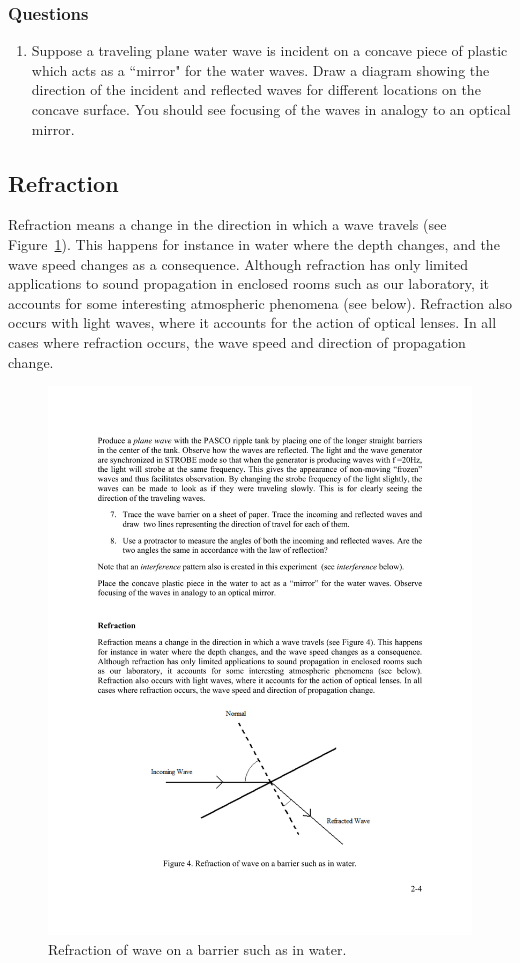 \documentclass[11pt]{NSF}
\def\ben{\begin{enumerate}}
\def\een{\end{enumerate}}
\def\i{\item{}}
\begin{document}
\subsubsection*{Questions}
\ben
\i Suppose a traveling plane water wave is incident 
on a concave piece of plastic which acts as a 
``mirror" for the water waves.
Draw a diagram showing the direction of the incident and 
reflected waves for different locations on the concave surface.
You should see focusing of the waves in analogy to
an optical mirror.

\een

\subsection{Refraction}

Refraction means a change in the direction in which a wave travels 
(see Figure~\ref{f:4}). 
This happens for instance in water where the depth changes, and the wave
speed changes as a consequence. Although refraction has only limited
applications to sound propagation in enclosed rooms such as our laboratory, it
accounts for some interesting atmospheric phenomena (see below). Refraction
also occurs with light waves, where it accounts for the action of optical
lenses. In all cases where refraction occurs, the wave speed and direction of
propagation change.
%
\begin{figure}[hbtp]
\begin{center}
\includegraphics[width=.6\textwidth]{fig2_4}
\caption{Refraction of wave on a barrier such as in water.}
\label{f:4}
\end{center}
\end{figure}
%
\end{document}
